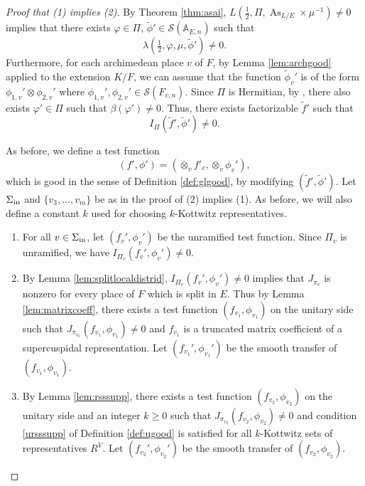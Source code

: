 \documentclass[11pt, reqno]{amsart}
\numberwithin{equation}{subsection}
\theoremstyle{plain}
\theoremstyle{definition}
\newcommand{\wt}{\widetilde}
\renewcommand{\AA}{\mathbb A}
\newcommand{\cS}{\mathcal S}
\DeclareMathOperator{\As}{As}
\newcommand{\inert}{\textnormal{in}}
\begin{document}
\begin{proof}[Proof that (1) implies (2)]
\leavevmode
By Theorem \ref{thm:asai},
$L(\frac{1}{2}, \Pi, \As_{L/E} \times \mu^{-1}) \neq 0$ 
implies that there exists 
$\varphi \in \Pi$, $\widetilde \phi' \in \cS(\AA_{E,n})$ such that
\[
    \lambda(\tfrac12, \varphi, \mu, \widetilde \phi') \neq 0.
\]
Furthermore, for each archimedean place $v$ of $F$,
by Lemma \ref{lem:archgood} applied
to the extension $K/F$, we can assume that
the function $\wt\phi_v'$ is 
of the form
$\phi_{1,v}' \otimes \phi_{2, v}'$ where
$\phi_{1,v}', \phi_{2,v}' \in \cS(F_{v,n})$.
Since $\Pi$ is Hermitian, by \cite{MR1344660}, 
there also exists 
$\varphi' \in \Pi$ such that $\beta(\varphi') \neq 0$.
Thus, there exists factorizable $\widetilde f'$
such that 
\[
    I_\Pi(\widetilde f', \widetilde \phi') \neq 0.
\]

As before, we define a test function
\[
    (f', \phi') = (\otimes_v f'_v, \otimes_v \phi_v'),
\]
which is good in the sense of 
Definition \ref{def:glgood}, by modifying 
$(\wt f', \wt\phi')$.
Let $\Sigma_{\inert}$ and $\{v_3, \dots, v_m\}$ 
be as in the proof of (2) implies (1).
As before, we will also define a constant $k$ used
for choosing $k$-Kottwitz representatives.
\begin{enumerate}[(1)]
\item
For all $v \in \Sigma_{\inert}$,
let $(f_v', \phi_v')$ be the unramified test function.
Since $\Pi_v$ is unramified, we have
$I_{\Pi_v}(f_v', \phi_v') \neq 0$.

\item By Lemma \ref{lem:splitlocaldistrid}, $I_{\Pi_v}(f_v', \phi_v') \neq 0$ implies that
$J_{\pi_v}$ is nonzero for every place
of $F$ which is split in $E$.
Thus by Lemma \ref{lem:matrixcoeff}, there exists
a test function $(f_{v_1}, \phi_{v_1})$
on the unitary side such that
$J_{\pi_{v_1}}(f_{v_1}, \phi_{v_1}) \neq 0$ and 
$f_{v_1}$ is a
truncated matrix coefficient of a supercuspidal
representation.
Let $(f_{v_1}', \phi_{v_1}')$ be the smooth transfer
of $(f_{v_1}, \phi_{v_1})$.

\item By Lemma \ref{lem:rsssupp}, 
there exists a test function $(f_{v_2}, \phi_{v_2})$
on the unitary side and an integer $k \ge 0$ such
that $J_{\pi_{v_2}}(f_{v_2}, \phi_{v_2}) \neq 0$
and condition \eqref{ursssupp} of Definition
\ref{def:ugood} is satisfied for all $k$-Kottwitz
sets of representatives $R^V$.
Let $(f_{v_2}', \phi_{v_2}')$ be the smooth transfer
of $(f_{v_2}, \phi_{v_2})$.


\end{enumerate}
\end{proof}
\end{document}
